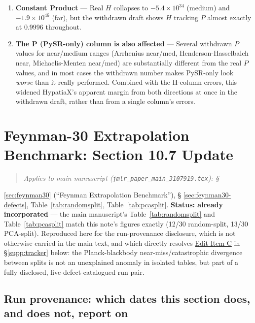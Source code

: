 \documentclass[11pt]{article}
\newenvironment{appliesto}[1]
  {\begin{quote}\small\itshape\noindent Applies to main manuscript
    (\texttt{jmlr\_paper\_main\_3107919.tex}): #1\end{quote}}
  {}
\begin{document}
\begin{landscape}
\begin{enumerate}
\item \textbf{Constant Product} --- Real $H$ collapses to $-5.4\times10^{34}$ (medium) and $-1.9\times10^{46}$ (far), but the withdrawn draft shows $H$ tracking $P$ almost exactly at 0.9996 throughout.

\item \textbf{The P (PySR-only) column is also affected} --- Several withdrawn $P$ values for near/medium ranges (Arrhenius near/med, Henderson-Hasselbalch near, Michaelis-Menten near/med) are substantially different from the real $P$ values, and in most cases the withdrawn number makes PySR-only look \emph{worse} than it really performed. Combined with the H-column errors, this widened HypatiaX's apparent margin from both directions at once in the withdrawn draft, rather than from a single column's errors.
\end{enumerate}

\end{landscape}

\clearpage
\section{Feynman-30 Extrapolation Benchmark: Section 10.7 Update}
\label{supp:feynman30}

\begin{appliesto}
\S\ref{sec:feynman30} (``Feynman Extrapolation Benchmark''), \S
\ref{sec:feynman30-defects}, Table~\ref{tab:randomsplit},
Table~\ref{tab:pcasplit}. \textbf{Status: already incorporated} --- the
main manuscript's Table~\ref{tab:randomsplit} and Table~\ref{tab:pcasplit}
match this note's figures exactly (12/30 random-split, 13/30 PCA-split).
Reproduced here for the run-provenance disclosure, which is not otherwise
carried in the main text, and which directly resolves
\hyperref[supp:edit-C]{Edit Item C} in \S\ref{supp:tracker} below: the
Planck-blackbody near-miss/catastrophic divergence between splits is not
an unexplained anomaly in isolated tables, but part of a fully disclosed,
five-defect-catalogued run pair.
\end{appliesto}

\subsection*{Run provenance: which dates this section does, and does not, report on}
\end{document}
